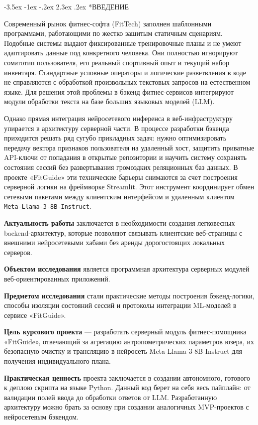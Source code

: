 \documentclass[14pt, a4paper]{extarticle}
\makeatletter
\renewcommand\section{\@startsection {section}{1}{\z@}%
                                   {-3.5ex \@plus -1ex \@minus -.2ex}%
                                   {2.3ex \@plus.2ex}%
                                   {\centering\normalfont\Large\bfseries}}
\makeatother
\begin{document}
\section*{ВВЕДЕНИЕ}


Современный рынок фитнес-софта (FitTech) заполнен шаблонными программами, работающими по жестко зашитым статичным сценариям. Подобные системы выдают фиксированные тренировочные планы и не умеют адаптировать данные под конкретного человека. Они полностью игнорируют соматотип пользователя, его реальный спортивный опыт и текущий набор инвентаря. Стандартные условные операторы и логические разветвления в коде не справляются с обработкой произвольных текстовых запросов на естественном языке. Для решения этой проблемы в бэкенд фитнес-сервисов интегрируют модули обработки текста на базе больших языковых моделей (LLM).

Однако прямая интеграция нейросетевого инференса в веб-инфраструктуру упирается в архитектуру серверной части. В процессе разработки бэкенда приходится решать ряд сугубо прикладных задач: нужно оптимизировать передачу вектора признаков пользователя на удаленный хост, защитить приватные API-ключи от попадания в открытые репозитории и научить систему сохранять состояния сессий без развертывания громоздких реляционных баз данных. В проекте «FitGuide» эти технические барьеры снимаются за счет построения серверной логики на фреймворке Streamlit. Этот инструмент координирует обмен сетевыми пакетами между клиентским интерфейсом и удаленным клиентом \texttt{Meta-Llama-3-8B-Instruct}.

\textbf{Актуальность работы} заключается в необходимости создания легковесных backend-архитектур, которые позволяют связывать клиентские веб-страницы с внешними нейросетевыми хабами без аренды дорогостоящих локальных серверов.

\textbf{Объектом исследования} является программная архитектура серверных модулей веб-ориентированных приложений.

\textbf{Предметом исследования} стали практические методы построения бэкенд-логики, способы изоляции состояний сессий и протоколы интеграции ML-моделей в сервисе «FitGuide».

\textbf{Цель курсового проекта} --- разработать серверный модуль фитнес-помощника «FitGuide», отвечающий за агрегацию антропометрических параметров юзера, их безопасную очистку и трансляцию в нейросеть Meta-Llama-3-8B-Instruct для получения индивидуального плана.

\textbf{Практическая ценность} проекта заключается в создании автономного, готового к деплою скрипта на языке Python. Данный код берет на себя весь пайплайн: от валидации полей ввода до обработки ответов от LLM. Разработанную архитектуру можно брать за основу при создании аналогичных MVP-проектов с нейросетевым бэкендом.
\end{document}
